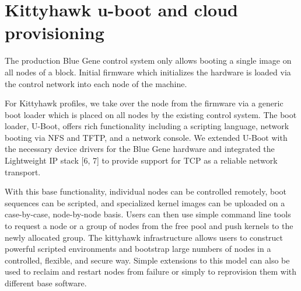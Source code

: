 \section{Kittyhawk u-boot and cloud provisioning}

The production Blue Gene control system only
allows booting a single image on all nodes of a block. 
Initial firmware which initializes the hardware is loaded 
via the control network into each node of the machine.

For Kittyhawk profiles, we take over the node from the 
firmware via a generic boot loader which is placed on all 
nodes by the existing control system. The boot loader, U-Boot, 
offers rich functionality including a scripting language, 
network booting via NFS and TFTP, and a network console. We extended
U-Boot with the necessary device drivers for the Blue Gene
hardware and integrated the Lightweight IP stack [6, 7] to
provide support for TCP as a reliable network transport.

With this base functionality, individual nodes can be controlled 
remotely, boot sequences can be scripted, and specialized kernel 
images can be uploaded on a case-by-case, node-by-node basis. 
Users can then use simple command line tools to request a node
or a group of nodes from the free pool and push kernels to the
newly allocated group.  The kittyhawk infrastructure allows
users to construct powerful scripted environments and
bootstrap large numbers of nodes in a controlled, flexible,
and secure way.  Simple extensions to this model can also be used
to reclaim and restart nodes from failure or simply to reprovision
them with different base software.
